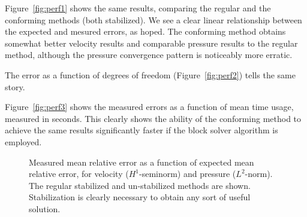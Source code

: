 \documentclass[onecolumn, twoside, a4paper, 11pt]{article}
\begin{document}
Figure~\ref{fig:perf1} shows the same results, comparing the regular and the
conforming methods (both stabilized). We see a clear linear relationship between
the expected and mesured errors, as hoped. The conforming method obtains
somewhat better velocity results and comparable pressure results to the regular
method, although the pressure convergence pattern is noticeably more erratic.

The error as a function of degrees of freedom (Figure~\ref{fig:perf2}) tells the
same story.

Figure~\ref{fig:perf3} shows the measured errors as a function of mean time usage, measured in
seconds. This clearly shows the ability of the conforming method to achieve the same results
significantly faster if the block solver algorithm is employed.

\begin{figure}
  \caption{
    Measured mean relative error as a function of expected mean relative error,
    for velocity ($H^1$-seminorm) and pressure ($L^2$-norm). The regular
    stabilized and un-stabilized methods are shown. Stabilization is clearly
    necessary to obtain any sort of useful solution.
  }
  \label{fig:perf1-unstab}
\end{figure}
\end{document}
